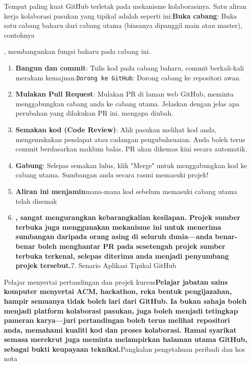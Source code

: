 Tempat paling kuat GitHub terletak pada mekanisme kolaborasinya. Satu aliran kerja kolaborasi pasukan yang tipikal adalah seperti ini:\textbf{Buka cabang}: Buka satu cabang baharu dari cabang utama (biasanya dipanggil main atau master), contohnya


, membangunkan fungsi baharu pada cabang ini.

\begin{enumerate}
  \item \textbf{Bangun dan commit}: Tulis kod pada cabang baharu, commit berkali-kali merakam kemajuan.\texttt{Dorong ke GitHub}: Dorong cabang ke repositori awan.
  \item \textbf{Mulakan Pull Request}: Mulakan PR di laman web GitHub, meminta menggabungkan cabang anda ke cabang utama. Jelaskan dengan jelas apa perubahan yang dilakukan PR ini, mengapa diubah.
  \item \textbf{Semakan kod (Code Review)}: Ahli pasukan melihat kod anda, mengemukakan pendapat atau cadangan pengubahsuaian. Anda boleh terus commit berdasarkan maklum balas, PR akan dikemas kini secara automatik.
  \item \textbf{Gabung}: Selepas semakan lulus, klik "Merge" untuk menggabungkan kod ke cabang utama. Sumbangan anda secara rasmi memasuki projek!
  \item \textbf{Aliran ini menjamin}mana-mana kod sebelum memasuki cabang utama telah disemak
  \item \textbf{, sangat mengurangkan kebarangkalian kesilapan. Projek sumber terbuka juga menggunakan mekanisme ini untuk menerima sumbangan daripada orang asing di seluruh dunia—anda benar-benar boleh menghantar PR pada sesetengah projek sumber terbuka terkenal, selepas diterima anda menjadi penyumbang projek tersebut.}7. Senario Aplikasi Tipikal GitHub
\end{enumerate}

Pelajar menyertai pertandingan dan projek kursus\textbf{Pelajar jabatan sains komputer menyertai ACM, hackathon, reka bentuk pengijazahan, hampir semuanya tidak boleh lari dari GitHub. Ia bukan sahaja boleh menjadi platform kolaborasi pasukan, juga boleh menjadi tetingkap pameran karya—juri pertandingan boleh terus melihat repositori anda, memahami kualiti kod dan proses kolaborasi. Ramai syarikat semasa merekrut juga meminta melampirkan halaman utama GitHub, sebagai bukti keupayaan teknikal.}Pangkalan pengetahuan peribadi dan hos nota

